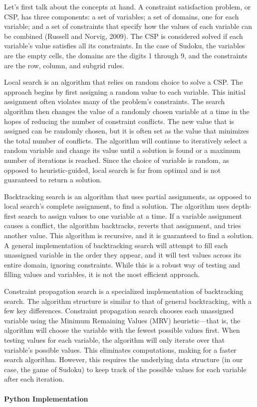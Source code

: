 \documentclass[12pt]{article}
\begin{document}
	Let's first talk about the concepts at hand. A constraint satisfaction problem, or CSP, has three components: a set of variables; a set of domains, one for each variable; and a set of constraints that specify how the values of each variable can be combined (Russell and Norvig, 2009). The CSP is considered solved if each variable's value satisfies all its constraints. In the case of Sudoku, the variables are the empty cells, the domains are the digits 1 through 9, and the constraints are the row, column, and subgrid rules.
	
	Local search is an algorithm that relies on random choice to solve a CSP. The approach begins by first assigning a random value to each variable. This initial assignment often violates many of the problem's constraints. The search algorithm then changes the value of a randomly chosen variable at a time in the hopes of reducing the number of constraint conflicts. The new value that is assigned can be randomly chosen, but it is often set as the value that minimizes the total number of conflicts. The algorithm will continue to iteratively select a random variable and change its value until a solution is found or a maximum number of iterations is reached. Since the choice of variable is random, as opposed to heuristic-guided, local search is far from optimal and is not guaranteed to return a solution.
	
	Backtracking search is an algorithm that uses partial assignments, as opposed to local search's complete assignment, to find a solution. The algorithm uses depth-first search to assign values to one variable at a time. If a variable assignment causes a conflict, the algorithm backtracks, reverts that assignment, and tries another value. This algorithm is recursive, and it is guaranteed to find a solution. A general implementation of backtracking search will attempt to fill each unassigned variable in the order they appear, and it will test values across its entire domain, ignoring constraints. While this is a robust way of testing and filling values and variables, it is not the most efficient approach.
	
	Constraint propagation search is a specialized implementation of backtracking search. The algorithm structure is similar to that of general backtracking, with a few key differences. Constraint propagation search chooses each unassigned variable using the Minimum Remaining Values (MRV) heuristic---that is, the algorithm will choose the variable with the fewest possible values first. When testing values for each variable, the algorithm will only iterate over that variable's possible values. This eliminates computations, making for a faster search algorithm. However, this requires the underlying data structure (in our case, the game of Sudoku) to keep track of the possible values for each variable after each iteration.\\\\
\textbf{Python Implementation}
	
\end{document}
